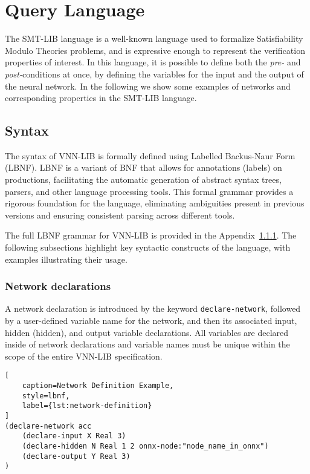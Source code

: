 \chapter{Query Language}\label{sec:specification_language}

The SMT-LIB language is a well-known language used to formalize 
Satisfiability Modulo Theories problems, and is expressive enough to
represent the verification properties of interest. In this language, 
it is possible to define both the \textit{pre-} and 
\textit{post-}conditions at once, by defining the variables for the
input and the output of the neural network. In the following we
show some examples of networks and corresponding properties in the
SMT-LIB language.

\section{Syntax}
\label{sec:syntax}


The syntax of VNN-LIB is formally defined using Labelled Backus-Naur Form (LBNF)\cite{8}. LBNF is a variant of BNF that allows for 
annotations (labels) on productions, facilitating the automatic generation of abstract syntax trees, parsers, and other language processing tools. 
This formal grammar provides a rigorous foundation for the language, eliminating ambiguities present in previous versions and ensuring consistent 
parsing across different tools.

The full LBNF grammar for VNN-LIB is provided in the Appendix~\ref{}. The following subsections highlight key syntactic constructs of the language,
with examples illustrating their usage.

\subsection{Network declarations}

A network declaration is introduced by the keyword \texttt{declare-network}, followed by a user-defined variable name for the network, 
and then its associated input, hidden (hidden), and output variable declarations. All variables are declared inside of network declarations and variable 
names must be unique within the scope of the entire VNN-LIB specification.

\begin{lstlisting}[
    caption=Network Definition Example, 
    style=lbnf,
    label={lst:network-definition}
]
(declare-network acc
    (declare-input X Real 3)
    (declare-hidden N Real 1 2 onnx-node:"node_name_in_onnx")
    (declare-output Y Real 3)
) 
\end{lstlisting}

